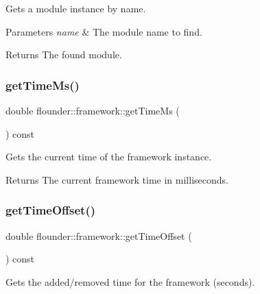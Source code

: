 Gets a module instance by name. 


\begin{DoxyParams}{Parameters}
{\em name} & The module name to find. \\
\hline
\end{DoxyParams}
\begin{DoxyReturn}{Returns}
The found module. 
\end{DoxyReturn}
\mbox{\label{classflounder_1_1framework_a1f60ddf8e191eb9182b3e90007d8f9a1}} 
\subsubsection{\texorpdfstring{get\+Time\+Ms()}{getTimeMs()}}
{\footnotesize\ttfamily double flounder\+::framework\+::get\+Time\+Ms (\begin{DoxyParamCaption}{ }\end{DoxyParamCaption}) const\hspace{0.3cm}{\ttfamily [inline]}}



Gets the current time of the framework instance. 

\begin{DoxyReturn}{Returns}
The current framework time in milliseconds. 
\end{DoxyReturn}
\mbox{\label{classflounder_1_1framework_a611e6fcdc2f2f484ebf8bbbdceacd45b}} 
\subsubsection{\texorpdfstring{get\+Time\+Offset()}{getTimeOffset()}}
{\footnotesize\ttfamily double flounder\+::framework\+::get\+Time\+Offset (\begin{DoxyParamCaption}{ }\end{DoxyParamCaption}) const\hspace{0.3cm}{\ttfamily [inline]}}



Gets the added/removed time for the framework (seconds). 

